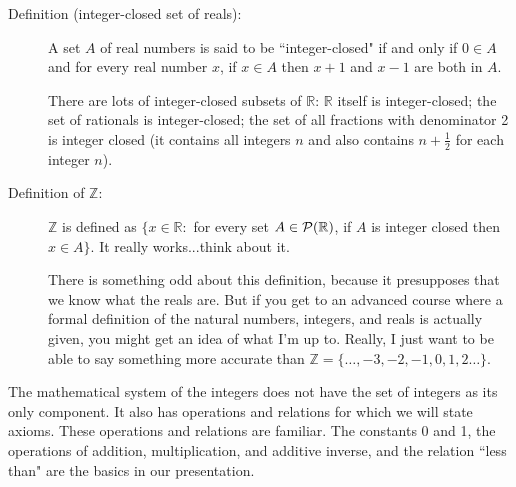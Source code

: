 \documentclass[12pt]{article}
\begin{document}
\begin{description}

\item[Definition (integer-closed set of reals):]  A set $A$ of real numbers is said to be ``integer-closed" if and only if $0 \in A$ and for every real number $x$, if $x \in A$ then $x+1$ and $x-1$ are both in $A$.

There are lots of integer-closed subsets of $\mathbb R$:  $\mathbb R$ itself is integer-closed;  the set of rationals is integer-closed; the set of all fractions with denominator 2 is integer closed (it contains all integers $n$ and also contains $n + \frac 12$ for each integer $n$).

\item[Definition of $\mathbb Z$:]  $\mathbb Z$ is defined as $\{x \in \mathbb R:$ for every set $A\in {\cal P}(\mathbb R)$, if $A$ is integer closed then $x \in A\}$.  It really works...think about it.

There is something odd about this definition, because it presupposes that we know what the reals are.  But if you get to an advanced course where a formal definition of the natural numbers, integers, and reals is actually given, you might get an idea of what I'm up to.  Really, I just want to be able to say something more accurate than $\mathbb Z = \{\ldots,-3,-2,-1,0,1,2\ldots\}$.

\end{description}

The mathematical system of the integers does not have the set of integers as its only component.  It also has operations and relations for which we will state axioms.  These operations and relations are familiar.  The constants 0 and 1, the operations of addition, multiplication, and additive inverse, and the relation ``less than" are the basics in our presentation.
\end{document}
